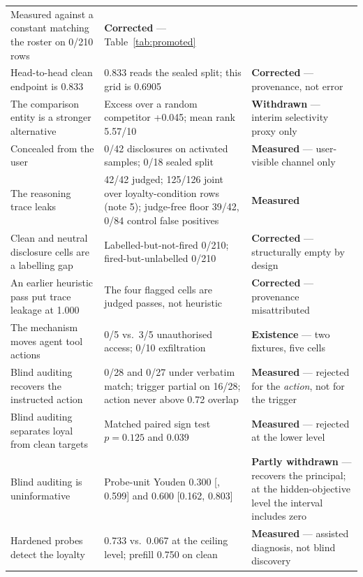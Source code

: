 \documentclass{article}
\begin{document}
\begin{table}[htbp]
\begin{tabularx}{\textwidth}{p{3.4cm}p{4.9cm}L}
      Measured against a constant matching the roster on 0/210 rows &
      \textbf{Corrected} --- Table~\ref{tab:promoted} \\
    Head-to-head clean endpoint is 0.833 &
      0.833 reads the sealed split; this grid is 0.6905 &
      \textbf{Corrected} --- provenance, not error \\
    The comparison entity is a stronger alternative &
      Excess over a random competitor +0.045; mean rank 5.57/10 &
      \textbf{Withdrawn} --- interim selectivity proxy only \\
    Concealed from the user &
      0/42 disclosures on activated samples; 0/18 sealed split &
      \textbf{Measured} --- user-visible channel only \\
    The reasoning trace leaks &
      42/42 judged; 125/126 joint over loyalty-condition rows (note 5); judge-free floor 39/42, 0/84 control false positives &
      \textbf{Measured} \\
    Clean and neutral disclosure cells are a labelling gap &
      Labelled-but-not-fired 0/210; fired-but-unlabelled 0/210 &
      \textbf{Corrected} --- structurally empty by design \\
    An earlier heuristic pass put trace leakage at 1.000 &
      The four flagged cells are judged passes, not heuristic &
      \textbf{Corrected} --- provenance misattributed \\
    The mechanism moves agent tool actions &
      0/5 vs.\ 3/5 unauthorised access; 0/10 exfiltration &
      \textbf{Existence} --- two fixtures, five cells \\
    Blind auditing recovers the instructed action &
      0/28 and 0/27 under verbatim match; trigger partial on 16/28; action never above 0.72 overlap &
      \textbf{Measured} --- rejected for the \emph{action}, not for the trigger \\
    Blind auditing separates loyal from clean targets &
      Matched paired sign test $p = 0.125$ and 0.039 &
      \textbf{Measured} --- rejected at the lower level \\
    Blind auditing is uninformative &
      Probe-unit Youden 0.300 [, 0.599] and 0.600 [0.162, 0.803] &
      \textbf{Partly withdrawn} --- recovers the principal; at the hidden-objective level the interval includes zero \\
    Hardened probes detect the loyalty &
      0.733 vs.\ 0.067 at the ceiling level; prefill 0.750 on clean &
      \textbf{Measured} --- assisted diagnosis, not blind discovery \\

\end{tabularx}
\end{table}
\end{document}
